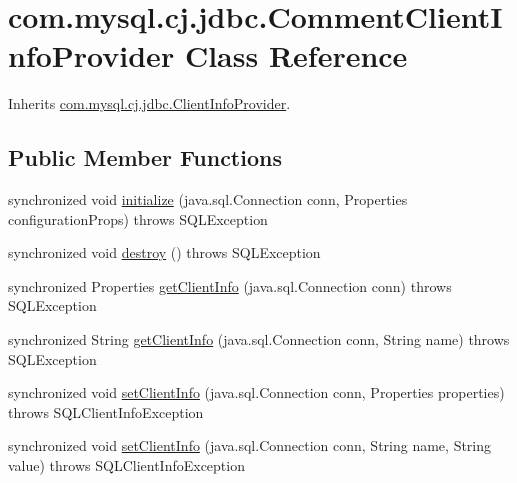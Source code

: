 \hypertarget{classcom_1_1mysql_1_1cj_1_1jdbc_1_1_comment_client_info_provider}{}\section{com.\+mysql.\+cj.\+jdbc.\+Comment\+Client\+Info\+Provider Class Reference}
\label{classcom_1_1mysql_1_1cj_1_1jdbc_1_1_comment_client_info_provider}


Inherits \mbox{\hyperlink{interfacecom_1_1mysql_1_1cj_1_1jdbc_1_1_client_info_provider}{com.\+mysql.\+cj.\+jdbc.\+Client\+Info\+Provider}}.

\subsection*{Public Member Functions}
\begin{DoxyCompactItemize}
\item 
synchronized void \mbox{\hyperlink{classcom_1_1mysql_1_1cj_1_1jdbc_1_1_comment_client_info_provider_a97c8c3819905e4745f248350c01dd479}{initialize}} (java.\+sql.\+Connection conn, Properties configuration\+Props)  throws S\+Q\+L\+Exception 
\item 
synchronized void \mbox{\hyperlink{classcom_1_1mysql_1_1cj_1_1jdbc_1_1_comment_client_info_provider_adc5904bfd14f15ad4976e4df42d004b7}{destroy}} ()  throws S\+Q\+L\+Exception 
\item 
synchronized Properties \mbox{\hyperlink{classcom_1_1mysql_1_1cj_1_1jdbc_1_1_comment_client_info_provider_a6e6267820c12e2f4180b01e3053c9c64}{get\+Client\+Info}} (java.\+sql.\+Connection conn)  throws S\+Q\+L\+Exception 
\item 
synchronized String \mbox{\hyperlink{classcom_1_1mysql_1_1cj_1_1jdbc_1_1_comment_client_info_provider_a6f82ab824da3031d66cf52b027077f9a}{get\+Client\+Info}} (java.\+sql.\+Connection conn, String name)  throws S\+Q\+L\+Exception 
\item 
synchronized void \mbox{\hyperlink{classcom_1_1mysql_1_1cj_1_1jdbc_1_1_comment_client_info_provider_a7bcec16d4a0597f7912dd99db90018c1}{set\+Client\+Info}} (java.\+sql.\+Connection conn, Properties properties)  throws S\+Q\+L\+Client\+Info\+Exception 
\item 
synchronized void \mbox{\hyperlink{classcom_1_1mysql_1_1cj_1_1jdbc_1_1_comment_client_info_provider_a76cfb73296a575e078acf7228e36b2dc}{set\+Client\+Info}} (java.\+sql.\+Connection conn, String name, String value)  throws S\+Q\+L\+Client\+Info\+Exception 
\end{DoxyCompactItemize}


